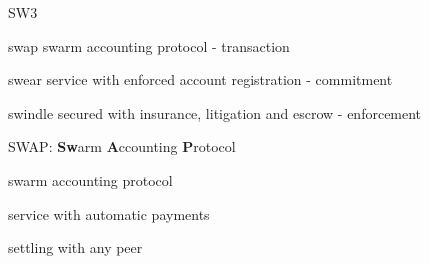 


\begin{frame}{SW3}
\begin{block}{swap}
swarm accounting protocol - transaction
\end{block}
\begin{block}{swear}
service with enforced account registration - commitment
\end{block}
\begin{block}{swindle}
secured with insurance, litigation and escrow - enforcement
\end{block}
\end{frame}


%
%

\begin{frame}{SWAP: \textbf{Sw}arm \textbf{A}ccounting \textbf{P}rotocol}
\begin{block}{}
swarm accounting protocol
\end{block}
\begin{block}{}
service with automatic payments
\end{block}
\begin{block}{}
settling with any peer
\end{block}
\end{frame}



